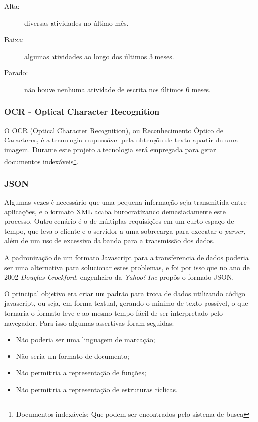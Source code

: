 \begin{description}
    \item[Alta:] diversas atividades no último mês.
    \item[Baixa:] algumas atividades ao longo dos últimos 3 meses.
    \item[Parado:] não houve nenhuma atividade de escrita nos últimos 6 meses.
\end{description}

\subsubsection{OCR - Optical Character Recognition}

O OCR (Optical Character Recognition), ou Reconhecimento Óptico de Caracteres, 
é a tecnologia responsável pela obtenção de texto apartir de uma imagem. Durante
este projeto a tecnologia será empregada para gerar documentos indexáveis\footnote{Documentos indexáveis: Que
podem ser encontrados pelo sistema de busca}.

\subsubsection{JSON}
Algumas vezes é necessário que uma pequena informação seja transmitida entre aplicações, e o formato XML acaba
burocratizando demasiadamente este processo. Outro cenário é o de múltiplas requisições em um curto espaço de
tempo, que leva o cliente e o servidor a uma sobrecarga para executar o \emph{parser}, além de um uso de
excessivo da banda para a transmissão dos dados.

A padronização de um formato Javascript para a transferencia de dados poderia ser uma alternativa para
solucionar estes problemas, e foi por isso que no ano de 2002 \emph{Douglas Crockford}, engenheiro da
\emph{Yahoo! Inc} propôs o formato JSON.

O principal objetivo era criar um padrão para troca de dados utilizando código javascript, ou seja, em forma
textual, gerando o mínimo de texto possível, o que tornaria o formato leve e ao mesmo tempo fácil de ser
interpretado pelo navegador. Para isso algumas assertivas foram seguidas:

\begin{itemize}
    \item Não poderia ser uma linguagem de marcação;
    \item Não seria um formato de documento;
    \item Não permitiria a representação de funções;
    \item Não permitiria a representação de estruturas cíclicas.
\end{itemize}

